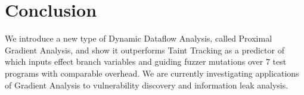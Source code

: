 \documentclass[conference]{IEEEtran}
\begin{document}
\section{Conclusion}

We introduce a new type of Dynamic Dataflow Analysis, called Proximal Gradient Analysis, and show it outperforms Taint Tracking as a predictor of which inputs effect branch variables and guiding fuzzer mutations over 7 test programs with comparable overhead. We are currently investigating applications of Gradient Analysis to vulnerability discovery and information leak analysis.




\end{document}
